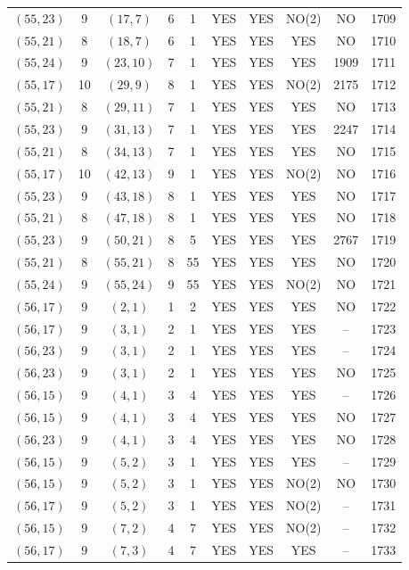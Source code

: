 \begin{longtable}{|c|c|c|c|c|c|c|c|c|c|}
$(55, 23)$ & 9 & $(17, 7)$ & 6 & 1 & YES & YES & NO(2) & NO & 1709\\
$(55, 21)$ & 8 & $(18, 7)$ & 6 & 1 & YES & YES & YES & NO & 1710\\
$(55, 24)$ & 9 & $(23, 10)$ & 7 & 1 & YES & YES & YES & 1909 & 1711\\
$(55, 17)$ & 10 & $(29, 9)$ & 8 & 1 & YES & YES & NO(2) & 2175 & 1712\\
$(55, 21)$ & 8 & $(29, 11)$ & 7 & 1 & YES & YES & YES & NO & 1713\\
$(55, 23)$ & 9 & $(31, 13)$ & 7 & 1 & YES & YES & YES & 2247 & 1714\\
$(55, 21)$ & 8 & $(34, 13)$ & 7 & 1 & YES & YES & YES & NO & 1715\\
$(55, 17)$ & 10 & $(42, 13)$ & 9 & 1 & YES & YES & NO(2) & NO & 1716\\
$(55, 23)$ & 9 & $(43, 18)$ & 8 & 1 & YES & YES & YES & NO & 1717\\
$(55, 21)$ & 8 & $(47, 18)$ & 8 & 1 & YES & YES & YES & NO & 1718\\
$(55, 23)$ & 9 & $(50, 21)$ & 8 & 5 & YES & YES & YES & 2767 & 1719\\
$(55, 21)$ & 8 & $(55, 21)$ & 8 & 55 & YES & YES & YES & NO & 1720\\
$(55, 24)$ & 9 & $(55, 24)$ & 9 & 55 & YES & YES & NO(2) & NO & 1721\\
$(56, 17)$ & 9 & $(2, 1)$ & 1 & 2 & YES & YES & YES & NO & 1722\\
$(56, 17)$ & 9 & $(3, 1)$ & 2 & 1 & YES & YES & YES & -- & 1723\\
$(56, 23)$ & 9 & $(3, 1)$ & 2 & 1 & YES & YES & YES & -- & 1724\\
$(56, 23)$ & 9 & $(3, 1)$ & 2 & 1 & YES & YES & YES & NO & 1725\\
$(56, 15)$ & 9 & $(4, 1)$ & 3 & 4 & YES & YES & YES & -- & 1726\\
$(56, 15)$ & 9 & $(4, 1)$ & 3 & 4 & YES & YES & YES & NO & 1727\\
$(56, 23)$ & 9 & $(4, 1)$ & 3 & 4 & YES & YES & YES & NO & 1728\\
$(56, 15)$ & 9 & $(5, 2)$ & 3 & 1 & YES & YES & YES & -- & 1729\\
$(56, 15)$ & 9 & $(5, 2)$ & 3 & 1 & YES & YES & NO(2) & NO & 1730\\
$(56, 17)$ & 9 & $(5, 2)$ & 3 & 1 & YES & YES & NO(2) & -- & 1731\\
$(56, 15)$ & 9 & $(7, 2)$ & 4 & 7 & YES & YES & NO(2) & -- & 1732\\
$(56, 17)$ & 9 & $(7, 3)$ & 4 & 7 & YES & YES & YES & -- & 1733\\

\end{longtable}

